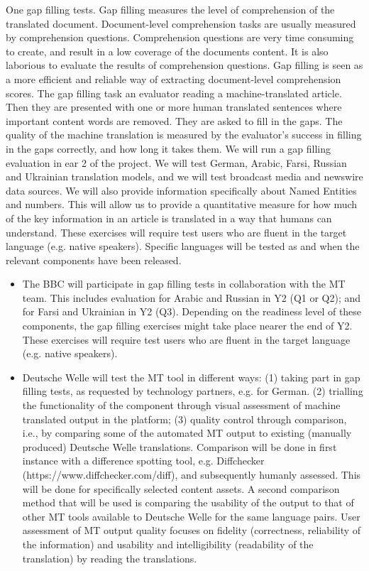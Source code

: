 One  gap filling tests. Gap filling measures the level of comprehension of the translated document. Document-level comprehension tasks are usually measured by comprehension questions. Comprehension questions are very time consuming to create, and result in a low coverage of the documents content. It is also laborious to evaluate the results of comprehension questions. Gap filling is seen as a more efficient and reliable way of extracting document-level comprehension scores. The gap filling task  an evaluator reading a machine-translated article. Then they are presented with one or more human translated sentences where important content words are removed. They are asked to fill in the gaps. The quality of the machine translation is measured by the evaluator's success in filling in the gaps correctly, and how long it takes them. 
We will run a gap filling evaluation in ear 2 of the project. We will test German, Arabic, Farsi, Russian and Ukrainian translation models, and we will test broadcast media and newswire data sources. We will also provide information specifically about Named Entities and numbers. This will allow us to provide a quantitative measure for how much of the key information in an article is translated in a way that humans can understand. These exercises will require test users who are fluent in the target language (e.g. native speakers). Specific languages will be tested as and when the relevant components have been released.  
 
\begin{itemize}
\item The BBC will participate in gap filling tests in collaboration with the MT team. This includes evaluation for  Arabic and Russian in Y2 (Q1 or Q2); and for Farsi and Ukrainian in Y2 (Q3). Depending on the readiness level of these components, the gap filling exercises might take place nearer the end of Y2. These exercises will require test users who are fluent in the target language (e.g. native speakers).

\item Deutsche Welle will test the MT tool in different ways: (1) taking part in gap filling tests, as requested by technology partners, e.g. for German. (2) trialling the functionality of the component through visual assessment of machine translated output in the platform; (3) quality control through comparison, i.e., by comparing some of the \SUMMA automated MT output to existing (manually produced) Deutsche Welle translations. Comparison will be done in first instance with a difference spotting tool, e.g. Diffchecker (https://www.diffchecker.com/diff), and subsequently humanly assessed. This will be done for specifically selected content assets. A second comparison method that will be used is comparing the usability of the output to that of other MT tools available to Deutsche Welle for the same language pairs. User assessment of MT output quality focuses on fidelity (correctness, reliability of the information) and usability and intelligibility (readability of the translation) by reading the translations.
\end{itemize}

